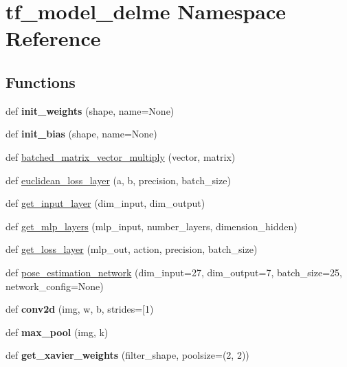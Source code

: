 \hypertarget{namespacetf__model__delme}{}\section{tf\+\_\+model\+\_\+delme Namespace Reference}
\label{namespacetf__model__delme}
\subsection*{Functions}
\begin{DoxyCompactItemize}
\item 
\hypertarget{namespacetf__model__delme_a983fbd9af39da3951031928f62c33d50}{}\label{namespacetf__model__delme_a983fbd9af39da3951031928f62c33d50} 
def {\bfseries init\+\_\+weights} (shape, name=None)
\item 
\hypertarget{namespacetf__model__delme_a1f697bf843211577fa19166f908770b8}{}\label{namespacetf__model__delme_a1f697bf843211577fa19166f908770b8} 
def {\bfseries init\+\_\+bias} (shape, name=None)
\item 
def \hyperlink{namespacetf__model__delme_a49d3580d15c8b935b0d77a7ec7afa2f5}{batched\+\_\+matrix\+\_\+vector\+\_\+multiply} (vector, matrix)
\item 
def \hyperlink{namespacetf__model__delme_a5aa99342556074aff93e73f11413fb72}{euclidean\+\_\+loss\+\_\+layer} (a, b, precision, batch\+\_\+size)
\item 
def \hyperlink{namespacetf__model__delme_a0f397474eac4969ef271c649ca83ddeb}{get\+\_\+input\+\_\+layer} (dim\+\_\+input, dim\+\_\+output)
\item 
def \hyperlink{namespacetf__model__delme_a2518cdb8353b343932ddb0e0c6249232}{get\+\_\+mlp\+\_\+layers} (mlp\+\_\+input, number\+\_\+layers, dimension\+\_\+hidden)
\item 
def \hyperlink{namespacetf__model__delme_a120bac7a9b2da59e3b4d963751308e6d}{get\+\_\+loss\+\_\+layer} (mlp\+\_\+out, action, precision, batch\+\_\+size)
\item 
def \hyperlink{namespacetf__model__delme_a003783bd07e757645fb97863107aae3a}{pose\+\_\+estimation\+\_\+network} (dim\+\_\+input=27, dim\+\_\+output=7, batch\+\_\+size=25, network\+\_\+config=None)
\item 
\hypertarget{namespacetf__model__delme_ab68bafcca840c8748a93a9b977236712}{}\label{namespacetf__model__delme_ab68bafcca840c8748a93a9b977236712} 
def {\bfseries conv2d} (img, w, b, strides=\mbox{[}1)
\item 
\hypertarget{namespacetf__model__delme_a10158106dc1cdf0c089211aac15250ab}{}\label{namespacetf__model__delme_a10158106dc1cdf0c089211aac15250ab} 
def {\bfseries max\+\_\+pool} (img, k)
\item 
\hypertarget{namespacetf__model__delme_aacd9bdbfb944ad8e27a8093a0d5da707}{}\label{namespacetf__model__delme_aacd9bdbfb944ad8e27a8093a0d5da707} 
def {\bfseries get\+\_\+xavier\+\_\+weights} (filter\+\_\+shape, poolsize=(2, 2))
\end{DoxyCompactItemize}


